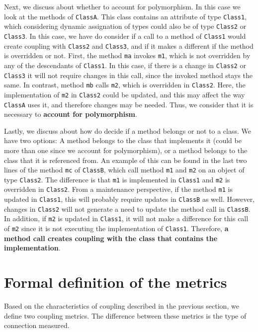 \documentclass[a4paper]{article}
\begin{document}
Next, we discuss about whether to account for polymorphism. In this case we look at the methods of \texttt{ClassA}. This class contains an attribute of type \texttt{Class1}, which considering dynamic assignation of types could also be of type \texttt{Class2} or \texttt{Class3}. In this case, we have do consider if a call to a method of \texttt{Class1} would create coupling with \texttt{Class2} and \texttt{Class3}, and if it makes a different if the method is overridden or not. First, the method \texttt{ma} invokes \texttt{m1}, which is not overridden by any of the descendants of \texttt{Class1}. In this case, if there is a change in \texttt{Class2} or \texttt{Class3} it will not require changes in this call, since the invoked method stays the same. In contrast, method \texttt{mb} calls \texttt{m2}, which is overridden in \texttt{Class2}. Here, the implementation of \texttt{m2} in \texttt{Class2} could be updated, and this may affect the way \texttt{ClassA} uses it, and therefore changes may be needed. Thus, we consider that it is necessary to \textbf{account for polymorphism}.

Lastly, we discuss about how do decide if a method belongs or not to a class. We have two options: A method belongs to the class that implements it (could be more than one since we account for polymorphism), or a method belongs to the class that it is referenced from. An example of this can be found in the last two lines of the method \texttt{mc} of \texttt{ClassB}, which call method \texttt{m1} and \texttt{m2} on an object of type \texttt{Class2}. The difference is that \texttt{m1} is implemented in \texttt{Class1} and \texttt{m2} is overridden in \texttt{Class2}. From a maintenance perspective, if the method \texttt{m1} is updated in \texttt{Class1}, this will probably require updates in \texttt{ClassB} as well. However, changes in \texttt{Class2} will not generate a need to update the method call in \texttt{ClassB}. In addition, if  \texttt{m2} is updated in \texttt{Class1}, it will not make a difference for this call of \texttt{m2} since it is not executing the implementation of \texttt{Class1}. Therefore, \textbf{a method call creates coupling with the class that contains the implementation}.

\section{Formal definition of the metrics}
Based on the characteristics of coupling described in the previous section, we define two coupling metrics. The difference between these metrics is the type of connection measured.
\end{document}
